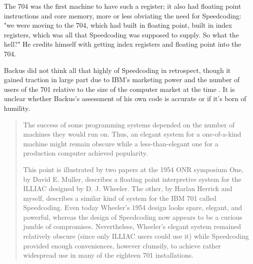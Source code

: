 The 704 was the first machine to have such a register; it also had floating
point instructions and core memory, more or less obviating the need for
Speedcoding: "we were moving to the 704, which had built in floating point,
built in index registers, which was all that Speedcoding was supposed to
supply. So what the hell?" \cite{backus_oral_history_2006} He credits himself
with getting index registers and floating point into the 704.

%

Backus did not think all that highly of Speedcoding in retrospect, though it
gained traction in large part due to IBM's marketing power and the number of
users of the 701 relative to the size of the computer market at the time
\cite{Backus_1980_Programming_in_America_in_1950s}. It is unclear whether
Backus's assessment of his own code is accurate or if it's born of humility.

\begin{quotation}
	The success of some programming systems depended on the number of machines
	they would run on. Thus, an elegant system for a one-of-a-kind machine might
	remain obscure while a less-than-elegant one for a production
	computer achieved popularity.

	This point is illustrated by two papers at the 1954 ONR symposium
	One, by David E. Muller, describes a floating point interpretive system for
	the ILLIAC designed by D. J. Wheeler. The other, by Harlan Herrick and myself,
	describes a similar kind of system for the IBM 701 called Speedcoding. Even
	today Wheeler's 1954 design looks spare, elegant, and powerful, whereas the
	design of Speedcoding now appears to be a curious jumble of compromises.
	Nevertheless, Wheeler's elegant system remained relatively obscure (since only
	ILLIAC users could use it) while Speedcoding provided enough conveniences,
	however clumsily, to achieve rather widespread use in many of the eighteen 701
	installations.
\end{quotation}

